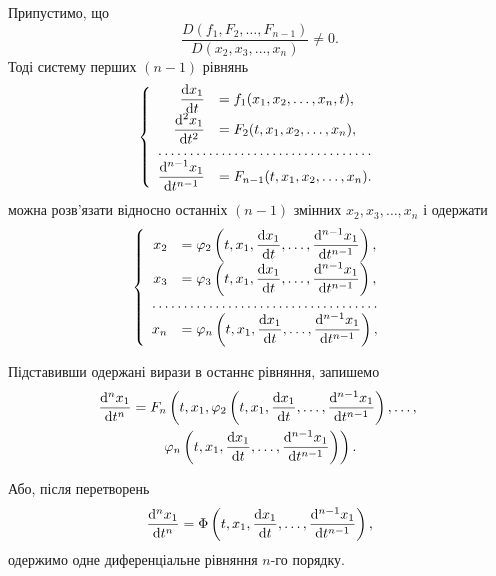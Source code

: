Припустимо, що \[\frac{D(f_1, F_2, \ldots, F_{n - 1})}{D(x_2, x_3, \ldots, x_n)} \ne 0.\] Тоді систему перших $(n - 1)$ рівнянь 
\begin{equation*}
	\left\{
		\begin{array}{rl}
			\dfrac{\diff x_1}{\diff t} &= f_1 (x_1, x_2, \ldots, x_n, t), \\
			\dfrac{\diff^2 x_1}{\diff t^2} &= F_2(t, x_1, x_2, \ldots, x_n), \\
			\hdotsfor{2} \\
			\dfrac{\diff^{n - 1} x_1}{\diff t^{n - 1}} &= F_{n - 1}(t, x_1, x_2, \ldots, x_n).
		\end{array}
	\right.
\end{equation*}
можна розв'язати відносно останніх $(n - 1)$ змінних $x_2, x_3, \ldots, x_n$ і одержати
\begin{equation*}
	\left\{
		\begin{array}{rl}
			x_2 &= \phi_2 \left( t, x_1, \dfrac{\diff x_1}{\diff t}, \ldots, \dfrac{\diff^{n - 1} x_1}{\diff t^{n - 1}} \right), \\
			x_3 &= \phi_3 \left( t, x_1, \dfrac{\diff x_1}{\diff t}, \ldots, \dfrac{\diff^{n - 1} x_1}{\diff t^{n - 1}} \right), \\
			\hdotsfor{2} \\
			x_n &= \phi_n \left( t, x_1, \dfrac{\diff x_1}{\diff t}, \ldots, \dfrac{\diff^{n - 1} x_1}{\diff t^{n - 1}} \right), \\
		\end{array}
	\right.
\end{equation*}

Підставивши одержані вирази в останнє рівняння, запишемо
\begin{multline*}
	\frac{\diff^n x_1}{\diff t^n} = F_n \left( t, x_1, \phi_2 \left( t, x_1, \frac{\diff x_1}{\diff t}, \ldots, \frac{\diff^{n - 1} x_1}{\diff t^{n - 1}} \right), \ldots, \right. \\ \left. \phi_n \left( t, x_1, \frac{\diff x_1}{\diff t}, \ldots, \frac{\diff^{n - 1} x_1}{\diff t^{n - 1}} \right) \right).	
\end{multline*}

Або, після перетворень
\begin{equation*}
	\frac{\mathop{}\!\mathrm{d}^n x_1}{\mathop{}\!\mathrm{d} t^n} = \Phi \left( t, x_1, \frac{\mathop{}\!\mathrm{d} x_1}{\mathop{}\!\mathrm{d} t}, \ldots, \frac{\mathop{}\!\mathrm{d}^{n - 1} x_1}{\mathop{}\!\mathrm{d} t^{n - 1}} \right),
\end{equation*}
одержимо одне диференціальне рівняння $n$-го порядку. \parvskip

